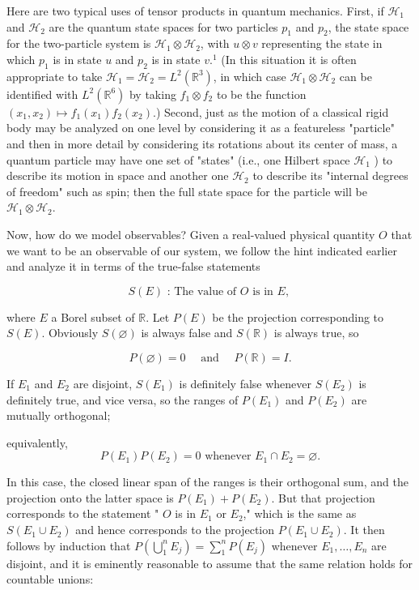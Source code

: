 \documentclass[10pt, letterpaper]{article}
\begin{document}
Here are two typical uses of tensor products in quantum mechanics. First, if $\mathcal{H}_{1}$ and $\mathcal{H}_{2}$ are the quantum state spaces for two particles $p_{1}$ and $p_{2}$, the state space for the two-particle system is $\mathcal{H}_{1} \otimes \mathcal{H}_{2}$, with $u \otimes v$ representing the state in which $p_{1}$ is in state $u$ and $p_{2}$ is in state $v .^{1}$ (In this situation it is often appropriate to take $\mathcal{H}_{1}=\mathcal{H}_{2}=L^{2}\left(\mathbb{R}^{3}\right)$, in which case $\mathcal{H}_{1} \otimes \mathcal{H}_{2}$ can be identified with $L^{2}\left(\mathbb{R}^{6}\right)$ by taking $f_{1} \otimes f_{2}$ to be the function $\left(x_{1}, x_{2}\right) \mapsto f_{1}\left(x_{1}\right) f_{2}\left(x_{2}\right)$.) Second, just as the motion of a classical rigid body may be analyzed on one level by considering it as a featureless "particle" and then in more detail by considering its rotations about its center of mass, a quantum particle may have one set of "states" (i.e., one Hilbert space $\mathcal{H}_{1}$ ) to describe its motion in space and another one $\mathcal{H}_{2}$ to describe its "internal degrees of freedom" such as spin; then the full state space for the particle will be $\mathcal{H}_{1} \otimes \mathcal{H}_{2}$.

Now, how do we model observables? Given a real-valued physical quantity $O$ that we want to be an observable of our system, we follow the hint indicated earlier and analyze it in terms of the true-false statements

$$
S(E) \text { : The value of } O \text { is in } E \text {, }
$$

where $E$ a Borel subset of $\mathbb{R}$. Let $P(E)$ be the projection corresponding to $S(E)$. Obviously $S(\varnothing)$ is always false and $S(\mathbb{R})$ is always true, so

$$
P(\varnothing)=0 \quad \text { and } \quad P(\mathbb{R})=I .
$$

If $E_{1}$ and $E_{2}$ are disjoint, $S\left(E_{1}\right)$ is definitely false whenever $S\left(E_{2}\right)$ is definitely true, and vice versa, so the ranges of $P\left(E_{1}\right)$ and $P\left(E_{2}\right)$ are mutually orthogonal;

equivalently,
$$
P\left(E_{1}\right) P\left(E_{2}\right)=0 \text { whenever } E_{1} \cap E_{2}=\varnothing .
$$

In this case, the closed linear span of the ranges is their orthogonal sum, and the projection onto the latter space is $P\left(E_{1}\right)+P\left(E_{2}\right)$. But that projection corresponds to the statement " $O$ is in $E_{1}$ or $E_{2}$," which is the same as $S\left(E_{1} \cup E_{2}\right)$ and hence corresponds to the projection $P\left(E_{1} \cup E_{2}\right)$. It then follows by induction that $P\left(\bigcup_{1}^{n} E_{j}\right)=\sum_{1}^{n} P\left(E_{j}\right)$ whenever $E_{1}, \ldots, E_{n}$ are disjoint, and it is eminently reasonable to assume that the same relation holds for countable unions:
\end{document}
